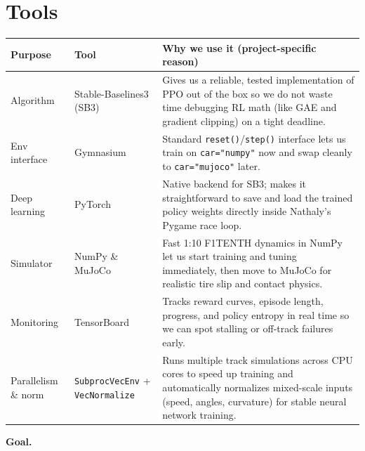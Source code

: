 \documentclass[11pt]{article}
\begin{document}
\section{Tools}
\begin{center}
\begin{tabular}{l l p{}}
\toprule
Purpose & Tool & Why we use it (project-specific reason)\\
\midrule
Algorithm & Stable-Baselines3 (SB3) & Gives us a reliable, tested implementation of PPO out of the box so we do not waste time debugging RL math (like GAE and gradient clipping) on a tight deadline.\\
Env interface & Gymnasium & Standard \texttt{reset()}/\texttt{step()} interface lets us train on \texttt{car="numpy"} now and swap cleanly to \texttt{car="mujoco"} later.\\
Deep learning & PyTorch & Native backend for SB3; makes it straightforward to save and load the trained policy weights directly inside Nathaly's Pygame race loop.\\
Simulator & NumPy \& MuJoCo & Fast 1:10 F1TENTH dynamics in NumPy let us start training and tuning immediately, then move to MuJoCo for realistic tire slip and contact physics.\\
Monitoring & TensorBoard & Tracks reward curves, episode length, progress, and policy entropy in real time so we can spot stalling or off-track failures early.\\
Parallelism \& norm & \texttt{SubprocVecEnv} + \texttt{VecNormalize} & Runs multiple track simulations across CPU cores to speed up training and automatically normalizes mixed-scale inputs (speed, angles, curvature) for stable neural network training.\\
\bottomrule
\end{tabular}
\end{center}

\noindent\textbf{Goal.}
\end{document}
